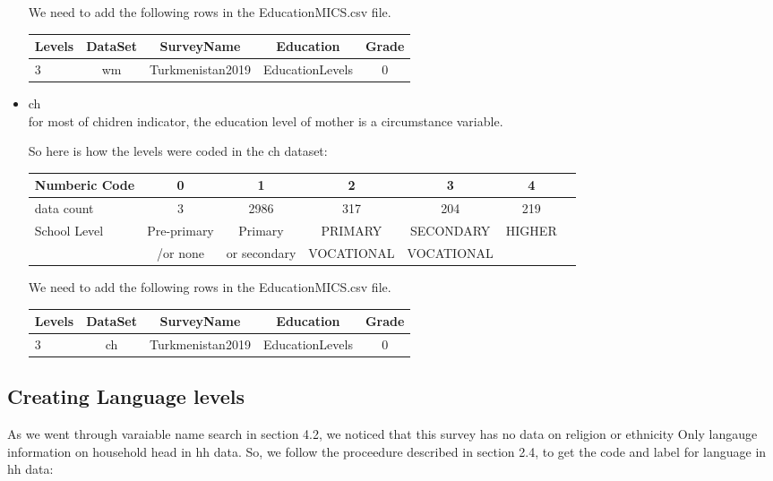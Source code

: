 \documentclass[12pt]{article}
\begin{document}
\begin{itemize}
We need to add the following rows in the EducationMICS.csv file.

    \begin{tabular}{|l|c|c|c|c|}
	\hline
	Levels & DataSet & SurveyName & Education & Grade\\
	\hline
	3 & wm & Turkmenistan2019 & EducationLevels & 0 \\
	\hline
    \end{tabular}

\item ch \\
      for most of chidren indicator, the education level of mother is a circumstance variable.

      So here is how the levels were coded in the ch dataset:
      
     {\small
    	\begin{tabular}{l|c|c|c|c|c|c|}
    		\hline 
    		Numberic Code & 0 & 1 & 2 & 3 & 4 \\
    		\hline
    		data count & 3  & 2986 & 317 & 204 & 219 \\
    		\hline
    		School Level & Pre-primary  & Primary   & PRIMARY& SECONDARY & HIGHER \\ 
    		&/or none & or secondary &VOCATIONAL &VOCATIONAL & \\ 			
    		\hline                                       
    	\end{tabular}
    }   
      
 We need to add the following rows in the EducationMICS.csv file.
 
 \begin{tabular}{|l|c|c|c|c|}
 	\hline
 	Levels & DataSet & SurveyName & Education & Grade\\
 	\hline
 	3 & ch & Turkmenistan2019 & EducationLevels & 0 \\
 	\hline
 \end{tabular}     
      
      
      
\end{itemize}


\subsection{Creating Language levels}
As we went through varaiable name search in section 4.2, we noticed that this survey has no data on religion or ethnicity Only langauge information on household head in hh data. So, we follow the proceedure described in section 2.4, to get the code and label for language in hh data:
\end{document}
